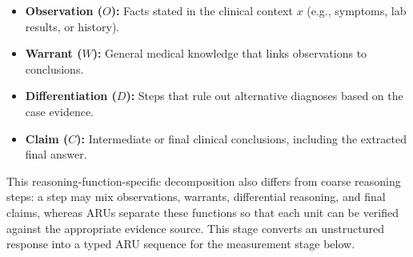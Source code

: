 \documentclass[a4paper,fleqn,doubleblind]{cas-sc}
\begin{document}
\begin{itemize}
    \item \textbf{Observation ($O$):} Facts stated in the clinical context $x$ (e.g., symptoms, lab results, or history).
    \item \textbf{Warrant ($W$):} General medical knowledge that links observations to conclusions.
    \item \textbf{Differentiation ($D$):} Steps that rule out alternative diagnoses based on the case evidence.
    \item \textbf{Claim ($C$):} Intermediate or final clinical conclusions, including the extracted final answer.
\end{itemize}

This reasoning-function-specific decomposition also differs from coarse reasoning steps: a step may mix observations, warrants, differential reasoning, and final claims, whereas ARUs separate these functions so that each unit can be verified against the appropriate evidence source.
This stage converts an unstructured response into a typed ARU sequence for the measurement stage below.
\end{document}
